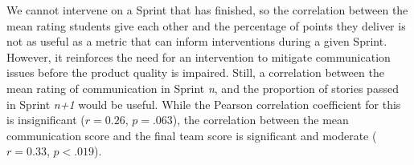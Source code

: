 We cannot intervene on a Sprint that has finished, so the correlation between the mean rating students give each other and the percentage of points they deliver is not as useful as a metric that can inform interventions during a given Sprint. However, it reinforces the need for an intervention to mitigate communication issues before the product quality is impaired. Still, a correlation between the mean rating of communication in Sprint \textit{n}, and the proportion of stories passed in Sprint \textit{n+1} would be useful. While the Pearson correlation coefficient for this is insignificant ($r = 0.26$, $p = .063$), the correlation between the mean communication score and the final team score is significant and moderate ($r = 0.33$, $p < .019$).







